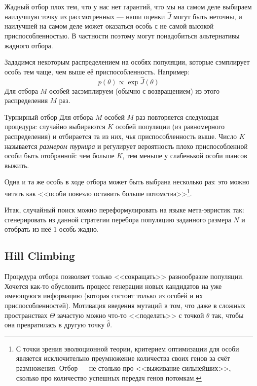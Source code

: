 Жадный отбор плох тем, что у нас нет гарантий, что мы на самом деле выбираем наилучшую точку из рассмотренных --- наши оценки $\hat{J}$ могут быть неточны, и наилучшей на самом деле может оказаться особь с не самой высокой приспособленностью. В частности поэтому могут понадобиться альтернативы жадного отбора.

\begin{example}
Зададимся некоторым распределением на особях популяции, которые сэмплирует особь тем чаще, чем выше её приспособленность. Например:
$$p(\theta) \propto \exp{\hat{J}(\theta)}$$
Для отбора $M$ особей засэмплируем (обычно с возвращением) из этого распределения $M$ раз.
\end{example}

\begin{exampleBox}[label=ex:tournir]{Турнирный отбор}
Для отбора $M$ особей $M$ раз повторяется следующая процедура: случайно выбираются $K$ особей популяции (из равномерного распределения) и отбирается та из них, чья приспособленность выше. Число $K$ называется \emph{размером турнира} и регулирует вероятность плохо приспособленной особи быть отобранной: чем больше $K$, тем меньше у слабенькой особи шансов выжить.
\end{exampleBox}

Одна и та же особь в ходе отбора может быть выбрана несколько раз: это можно читать как <<особи повезло оставить больше потомства>>\footnote{С точки зрения эволюционной теории, критерием оптимизации для особи является исключительно преумножение количества своих генов за счёт размножения. Отбор --- не столько про <<выживание сильнейших>>, сколько про количество успешных передач генов потомкам.}.

Итак, случайный поиск можно переформулировать на языке мета-эвристик так: сгенерировать из данной стратегии перебора популяцию заданного размера $N$ и отобрать из неё 1 особь жадно.

\subsection{Hill Climbing}

Процедура отбора позволяет только <<сокращать>> разнообразие популяции. Хочется как-то обусловить процесс генерации новых кандидатов на уже имеющуюся информацию (которая состоит только из особей и их приспособленностей). Мотивация введения мутаций в том, что даже в сложных пространствах $\Theta$ зачастую можно что-то <<поделать>> с точкой $\theta$ так, чтобы она превратилась в другую точку $\hat{\theta}$.

